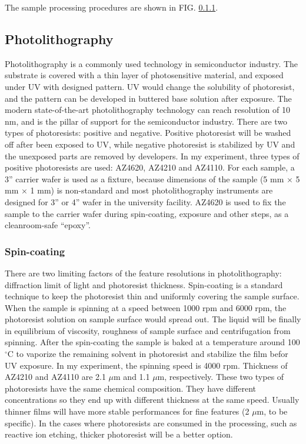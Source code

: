 \documentclass[pdflatex, sectionletters, 12pt]{pittetd}    %
\begin{document}
The sample processing procedures are shown in FIG. \ref{}. 


\subsection{Photolithography}
\label{SEC:Photolithography}

Photolithography is a commonly used technology in semiconductor industry. The substrate is covered with a thin layer of photosensitive material, and exposed under UV with designed pattern. UV would change the solubility of photoresist, and the pattern can be developed in buttered base solution after exposure. The modern state-of-the-art photolithography technology can reach resolution of 10 nm, and is the pillar of support for the semiconductor industry. There are two types of photoresists: positive and negative. Positive photoresist will be washed off after been exposed to UV, while negative photoresist is stabilized by UV and the unexposed parts are removed by developers. In my experiment, three types of positive photoresists are used: AZ4620, AZ4210 and AZ4110. For each sample, a 3'' carrier wafer is used as a fixture, because dimensions of the sample (5 mm $\times$ 5 mm $\times$ 1 mm) is non-standard and most photolithography instruments are designed for 3'' or 4'' wafer in the university facility. AZ4620 is used to fix the sample to the carrier wafer during spin-coating, exposure and other steps, as a cleanroom-safe ``epoxy''. 


\subsubsection{Spin-coating}

There are two limiting factors of the feature resolutions in photolithography: diffraction limit of light and photoresist thickness. Spin-coating is a standard technique to keep the photoresist thin and uniformly covering the sample surface. When the sample is spinning at a speed between 1000 rpm and 6000 rpm, the photoresist solution on sample surface would spread out. The liquid will be finally in equilibrium of viscosity, roughness of sample surface and centrifugation from spinning. After the spin-coating the sample is baked at a temperature around 100$^{\circ}$C to vaporize the remaining solvent in photoresist and stabilize the film befor UV exposure. In my experiment, the spinning speed is 4000 rpm. Thickness of AZ4210 and AZ4110 are 2.1 $\mu$m and 1.1 $\mu$m, respectively. These two types of photoresists have the same chemical composition. They have different concentrations so they end up with different thickness at the same speed. Usually thinner films will have more stable performances for fine features (2 $\mu$m, to be specific). In the cases where photoresists are consumed in the processing, such as reactive ion etching, thicker photoresist will be a better option.
\end{document}
